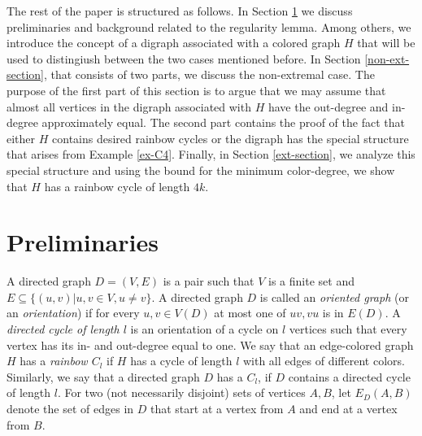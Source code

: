 \documentclass{article}
\begin{document}
    
The rest of the paper is structured as follows. In Section \ref{prelim-section} we discuss preliminaries and  background related to the regularity lemma. Among others, we introduce the concept of a digraph associated with a colored graph $H$ that will be used to distingiush between the two cases mentioned before. In Section \ref{non-ext-section}, that consists of two parts, we discuss the non-extremal case.  The purpose of the first part of this section is to argue that we may assume that almost all vertices in the digraph associated with $H$ have the out-degree and in-degree approximately equal. The second part contains the proof of the fact that either $H$ contains desired rainbow cycles or the digraph has the special structure that arises from Example \ref{ex-C4}. Finally, in Section \ref{ext-section}, we analyze this special structure and using the bound for the minimum color-degree, we show that $H$ has a rainbow cycle of length $4k$.

\section{Preliminaries}\label{prelim-section}
A directed graph $D=(V, E)$ is a pair such that $V$ is a finite set and $E\subseteq \{(u,v)| u,v\in V, u\neq v\}$. A directed graph $D$ is called an {\it oriented graph} (or an {\it orientation}) if for every $u,v\in V(D)$ at most one of $uv, vu$ is in $E(D).$ 
A {\it directed cycle of length $l$} is an orientation of a cycle on $l$ vertices such that every vertex has its in- and out-degree equal to one. We say that an edge-colored graph $H$ has a {\it rainbow $C_l$} if  $H$ has a cycle of length $l$ with all edges of different colors. Similarly, we say that a directed graph $D$ has a {\it $C_l$}, if $D$ contains a directed cycle of length $l$. 
For two (not necessarily disjoint) sets of vertices $A, B$, let $E_D(A,B)$ denote the set of edges in $D$ that start at a vertex from $A$ and end at a vertex from $B$.
\end{document}
